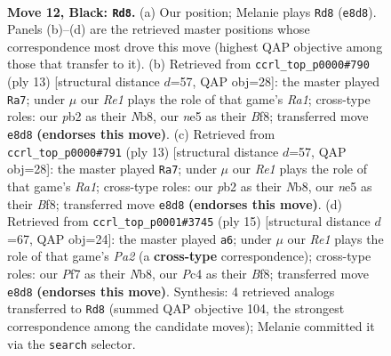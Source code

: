 \documentclass[11pt]{article}
\begin{document}
\clearpage

\begin{figure}[p]\centering
\begin{subfigure}{0.46\textwidth}\centering
\resizebox{\linewidth}{!}{%
\newchessgame
\chessboard[
  setfen={rnb1r1k1/1pp1bppp/pn1qp3/4N3/2pP4/4B1P1/PP2PPBP/RN1QRK2 b - - 3 12},
  showmover=false,
  pgfstyle=straightmove, color=movearrow, markmove={e8-d8}
]}
\caption{}
\end{subfigure}\hfill
\begin{subfigure}{0.46\textwidth}\centering
\resizebox{\linewidth}{!}{%
\newchessgame
\chessboard[
  setfen={rnbqkb1r/1p3ppp/p3pn2/2p1N3/2pP4/N5P1/PP2PPBP/R1BQK2R b KQkq - 1 7},
  showmover=false,
  pgfstyle=straightmove, color=movearrow, markmove={a8-a7}
]}
\caption{}
\end{subfigure}
\\[4pt]
\begin{subfigure}{0.46\textwidth}\centering
\resizebox{\linewidth}{!}{%
\newchessgame
\chessboard[
  setfen={rnbqkb1r/1p3ppp/p3pn2/2p1N3/2pP4/N5P1/PP2PPBP/R1BQK2R b KQkq - 1 7},
  showmover=false,
  pgfstyle=straightmove, color=movearrow, markmove={a8-a7}
]}
\caption{}
\end{subfigure}\hfill
\begin{subfigure}{0.46\textwidth}\centering
\resizebox{\linewidth}{!}{%
\newchessgame
\chessboard[
  setfen={rn1qkb1r/pb3ppp/2p1pn2/1p2N3/P1pP4/6P1/1P2PPBP/RNBQ1RK1 b kq - 0 8},
  showmover=false,
  pgfstyle=straightmove, color=movearrow, markmove={a7-a6}
]}
\caption{}
\end{subfigure}
\caption{\textbf{Move 12, Black: \texttt{Rd8}.} (a) Our position; Melanie plays \texttt{Rd8} (\texttt{e8d8}). Panels (b)--(d) are the retrieved master positions whose correspondence most drove this move (highest QAP objective among those that transfer to it). (b) Retrieved from \texttt{ccrl\_top\_p0000\#790} (ply 13) [structural distance $d$=57, QAP obj=28]: the master played \texttt{Ra7}; under $\mu$ our \emph{Re1} plays the role of that game's \emph{Ra1}; cross-type roles: our \emph{p}b2 as their \emph{N}b8, our \emph{n}e5 as their \emph{B}f8; transferred move \texttt{e8d8} \textbf{(endorses this move)}. (c) Retrieved from \texttt{ccrl\_top\_p0000\#791} (ply 13) [structural distance $d$=57, QAP obj=28]: the master played \texttt{Ra7}; under $\mu$ our \emph{Re1} plays the role of that game's \emph{Ra1}; cross-type roles: our \emph{p}b2 as their \emph{N}b8, our \emph{n}e5 as their \emph{B}f8; transferred move \texttt{e8d8} \textbf{(endorses this move)}. (d) Retrieved from \texttt{ccrl\_top\_p0001\#3745} (ply 15) [structural distance $d$=67, QAP obj=24]: the master played \texttt{a6}; under $\mu$ our \emph{Re1} plays the role of that game's \emph{Pa2} (a \textbf{cross-type} correspondence); cross-type roles: our \emph{P}f7 as their \emph{N}b8, our \emph{P}c4 as their \emph{B}f8; transferred move \texttt{e8d8} \textbf{(endorses this move)}. Synthesis: 4 retrieved analogs transferred to \texttt{Rd8} (summed QAP objective 104, the strongest correspondence among the candidate moves); Melanie committed it via the \texttt{search} selector.}
\label{fig:thought-m23}
\end{figure}
\end{document}
